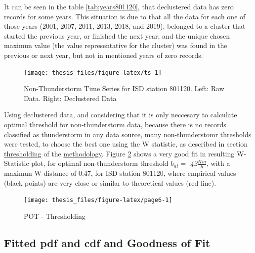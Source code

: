 \documentclass[12pt,oneside]{reedthesis}
\begin{document}
It can be seen in the table \ref{tab:years801120}, that declustered data has zero records for some years. This situation is due to that all the data for each one of those years (2001, 2007, 2011, 2013, 2018, and 2019), belonged to a cluster that started the previous year, or finished the next year, and the unique chosen maximun value (the value representative for the cluster) was found in the previous or next year, but not in mentioned years of zero records.
\begin{figure}

{\centering \texttt{[image: thesis\_files/figure-latex/ts-1]} 

}

\caption{Non-Thunderstorm Time Series for ISD station 801120. Left: Raw Data. Right: Declustered Data}\label{fig:ts}
\end{figure}
Using declustered data, and considering that it is only neccesary to calculate optimal threshold for non-thunderstorm data, because there is no records classified as thunderstorm in any data source, many non-thunderstomr thresholds were tested, to choose the best one using the W statistic, as described in section \protect\hyperlink{thresholding}{thresholding} of the \protect\hyperlink{rmd-method}{methodology}. Figure \ref{fig:page6} shows a very good fit in resulting W-Statistic plot, for optimal non-thunderstorm threshold \(b_{nt} =\) \emph{42}\(\frac{Km}{h}\), with a maximun W distance of 0.47, for ISD station 801120, where empirical values (black points) are very close or similar to theoretical values (red line).

\footnotesize
\begin{figure}

{\centering \texttt{[image: thesis\_files/figure-latex/page6-1]} 

}

\caption{POT - Thresholding}\label{fig:page6}
\end{figure}
\normalsize

\hypertarget{fitted-pdf-and-cdf-and-goodness-of-fit}{%
\subsection{Fitted pdf and cdf and Goodness of Fit}\label{fitted-pdf-and-cdf-and-goodness-of-fit}}
\end{document}
